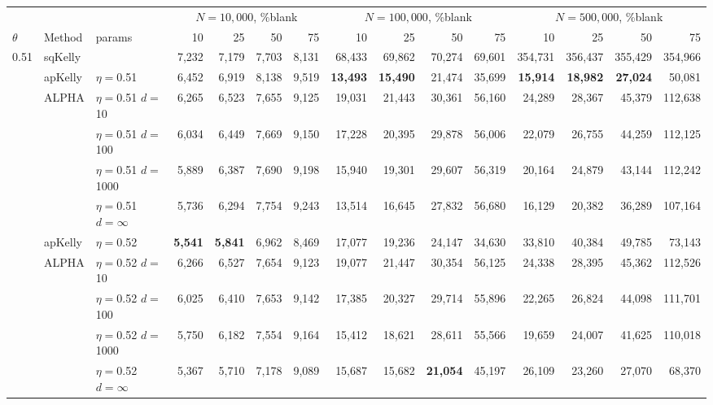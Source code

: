 \documentclass[aoas]{imsart}
\begin{document}
\begin{table}
\centering
\tiny
\begin{tabular}{lll|rrrr|rrrr|rrrr} 
& & & \multicolumn{4}{|c|}{$N=10{,}000$, \%blank} &  \multicolumn{4}{|c|}{$N=100{,}000$, \%blank} & \multicolumn{4}{|c}{$N=500{,}000$, \%blank} \\ 
$\theta$ & Method & params & 10 & 25 & 50 & 75  & 10 & 25 & 50 & 75  & 10 & 25 & 50 & 75  \\
\hline 0.51 & sqKelly & & 7,232  & 7,179  & 7,703  & 8,131  & 68,433  & 69,862  & 70,274  & 69,601  & 354,731  & 356,437  & 355,429  & 354,966  \\
\cline{2-15} & apKelly & $\eta=$0.51 & 6,452  & 6,919  & 8,138  & 9,519  & \bf{13,493}  & \bf{15,490}  & 21,474  & 35,699  & \bf{15,914}  & \bf{18,982}  & \bf{27,024}  & 50,081  \\
\cline{2-15}
& ALPHA & $\eta=$0.51 $d=$10 & 6,265  & 6,523  & 7,655  & 9,125  & 19,031  & 21,443  & 30,361  & 56,160  & 24,289  & 28,367  & 45,379  & 112,638  \\
&  & $\eta=$0.51 $d=$100 & 6,034  & 6,449  & 7,669  & 9,150  & 17,228  & 20,395  & 29,878  & 56,006  & 22,079  & 26,755  & 44,259  & 112,125  \\
&  & $\eta=$0.51 $d=$1000 & 5,889  & 6,387  & 7,690  & 9,198  & 15,940  & 19,301  & 29,607  & 56,319  & 20,164  & 24,879  & 43,144  & 112,242  \\
 &  & $\eta=$0.51 $d=\infty$ & 5,736  & 6,294  & 7,754  & 9,243  & 13,514  & 16,645  & 27,832  & 56,680  & 16,129  & 20,382  & 36,289  & 107,164  \\
\cline{2-15} & apKelly & $\eta=$0.52 & \bf{5,541}  & \bf{5,841}  & 6,962  & 8,469  & 17,077  & 19,236  & 24,147  & 34,630  & 33,810  & 40,384  & 49,785  & 73,143  \\
\cline{2-15}
& ALPHA & $\eta=$0.52 $d=$10 & 6,266  & 6,527  & 7,654  & 9,123  & 19,077  & 21,447  & 30,354  & 56,125  & 24,338  & 28,395  & 45,362  & 112,526  \\
&  & $\eta=$0.52 $d=$100 & 6,025  & 6,410  & 7,653  & 9,142  & 17,385  & 20,327  & 29,714  & 55,896  & 22,265  & 26,824  & 44,098  & 111,701  \\
&  & $\eta=$0.52 $d=$1000 & 5,750  & 6,182  & 7,554  & 9,164  & 15,412  & 18,621  & 28,611  & 55,566  & 19,659  & 24,007  & 41,625  & 110,018  \\
 &  & $\eta=$0.52 $d=\infty$ & 5,367  & 5,710  & 7,178  & 9,089  & 15,687  & 15,682  & \bf{21,054}  & 45,197  & 26,109  & 23,260  & 27,070  & 68,370  \\

\end{tabular}
\end{table}
\end{document}
